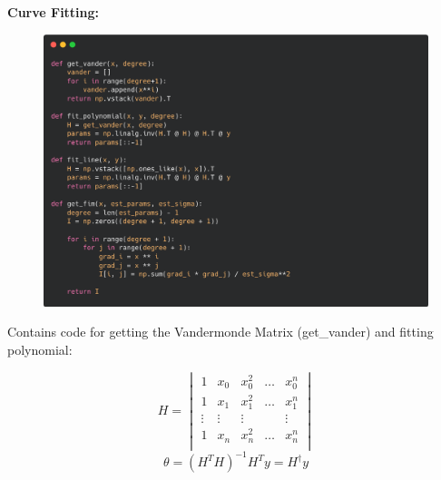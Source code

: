 \documentclass[12pt]{article}
\begin{document}
\raggedright \textbf{Curve Fitting:}
\begin{figure}[H] 
\centering \includegraphics[scale=0.25]{code-curve.png}  
\end{figure}

Contains code for getting the Vandermonde Matrix (get\_vander) and fitting polynomial:

\begin{equation}
    H = \begin{vmatrix}
      1       & x_{0} & x_{0}^{2} & \dots & x_{0}^{n} \\ 
      1       & x_{1} & x_{1}^{2} & \dots & x_{1}^{n} \\
      \vdots  & \vdots&  \vdots   &       & \vdots    \\
      1       & x_{n} & x_{n}^{2} & \dots & x_{n}^{n} \\ 
    \end{vmatrix}
\end{equation}
\newline
\begin{equation}
    \theta = (H^TH)^{-1}H^Ty = H^{\dag}y
\end{equation}

\newpage
\end{document}
